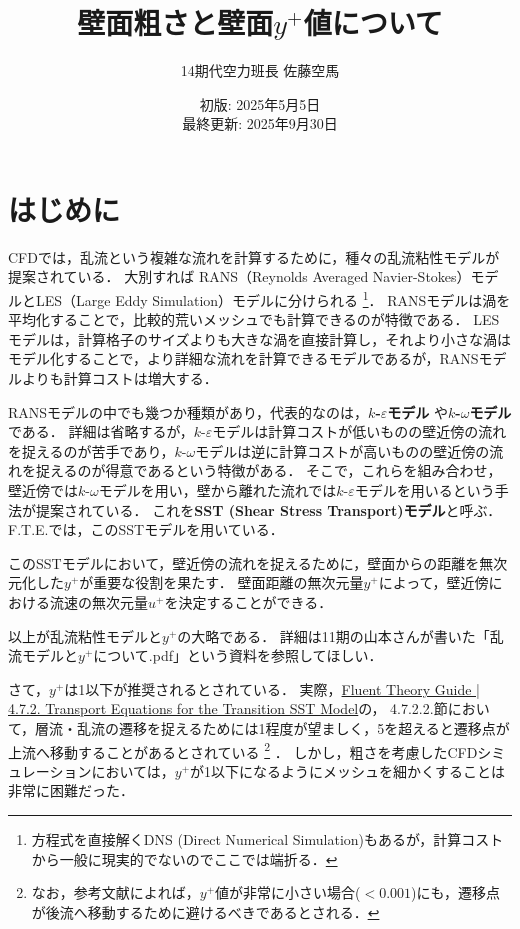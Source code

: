 \documentclass[uplatex,dvipdfmx,a4j,12pt]{jsarticle}
\title{壁面粗さと壁面$y^+$値について}
\author{14期代空力班長 佐藤空馬}
\date{初版: 2025年5月5日 \\ 最終更新: 2025年9月30日}
\begin{document}
\maketitle

\section{はじめに}

CFDでは，乱流という複雑な流れを計算するために，種々の乱流粘性モデルが提案されている．
大別すれば RANS（Reynolds Averaged Navier-Stokes）モデルとLES（Large Eddy Simulation）モデルに分けられる
\footnote{方程式を直接解くDNS (Direct Numerical Simulation)もあるが，計算コストから一般に現実的でないのでここでは端折る．}．
RANSモデルは渦を平均化することで，比較的荒いメッシュでも計算できるのが特徴である．
LESモデルは，計算格子のサイズよりも大きな渦を直接計算し，それより小さな渦はモデル化することで，より詳細な流れを計算できるモデルであるが，RANSモデルよりも計算コストは増大する．

RANSモデルの中でも幾つか種類があり，代表的なのは，\textbf{$k$-$\varepsilon$モデル} や\textbf{$k$-$\omega$モデル} である．
詳細は省略するが，$k$-$\varepsilon$モデルは計算コストが低いものの壁近傍の流れを捉えるのが苦手であり，$k$-$\omega$モデルは逆に計算コストが高いものの壁近傍の流れを捉えるのが得意であるという特徴がある．
そこで，これらを組み合わせ，壁近傍では$k$-$\omega$モデルを用い，壁から離れた流れでは$k$-$\varepsilon$モデルを用いるという手法が提案されている．
これを\textbf{SST (Shear Stress Transport)モデル}と呼ぶ．
F.T.E.では，このSSTモデルを用いている．

このSSTモデルにおいて，壁近傍の流れを捉えるために，壁面からの距離を無次元化した\textbf{$y^+$}が重要な役割を果たす．
壁面距離の無次元量$y^+$によって，壁近傍における流速の無次元量$u^+$を決定することができる．

以上が乱流粘性モデルと$y^+$の大略である．
詳細は11期の山本さんが書いた「乱流モデルと$y^+$について.pdf」という資料を参照してほしい．

さて，$y^+$は1以下が推奨されるとされている．
実際，\href{https://ansyshelp.ansys.com/public//Views/Secured/corp/v251/en/flu_th/flu_th_sec_turb_sst_add_eq.html}{Fluent Theory Guide | 4.7.2. Transport Equations for the Transition SST Model}の，
4.7.2.2.節において，層流・乱流の遷移を捉えるためには1程度が望ましく，5を超えると遷移点が上流へ移動することがあるとされている
\footnote{なお，参考文献\cite{sst_mesh}によれば，$y^+$値が非常に小さい場合($< 0.001$)にも，遷移点が後流へ移動するために避けるべきであるとされる．}
．
しかし，粗さを考慮したCFDシミュレーションにおいては，$y^+$が1以下になるようにメッシュを細かくすることは非常に困難だった．
\end{document}
